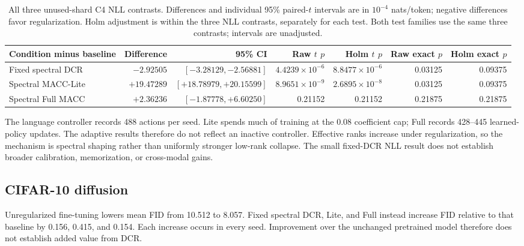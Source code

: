 \documentclass[10pt,a4paper,twocolumn]{article}
\begin{document}
\begin{table}[tbp]
\caption{All three unused-shard C4 NLL contrasts. Differences and individual
95\% paired-$t$ intervals are in $10^{-4}$ nats/token; negative differences
favor regularization. Holm adjustment is within the three NLL contrasts,
separately for each test. Both test families use the same three contrasts; intervals are unadjusted.}
\label{tab:c4_contrasts}
\centering\small
\begin{tabularx}{\textwidth}{@{}Yrrrrrr@{}}
\toprule
Condition minus baseline & Difference & 95\% CI &
Raw $t$ $p$ & Holm $t$ $p$ & Raw exact $p$ & Holm exact $p$ \\
\midrule
Fixed spectral DCR & $-2.92505$ & $[-3.28129,-2.56881]$ & $4.4239\times10^{-6}$ & $8.8477\times10^{-6}$ & 0.03125 & 0.09375 \\
Spectral MACC-Lite & $+19.47289$ & $[+18.78979,+20.15599]$ & $8.9651\times10^{-9}$ & $2.6895\times10^{-8}$ & 0.03125 & 0.09375 \\
Spectral Full MACC & $+2.36236$ & $[-1.87778,+6.60250]$ & 0.21152 & 0.21152 & 0.21875 & 0.21875 \\
\bottomrule
\end{tabularx}
\end{table}


The language controller records 488 actions per seed.
Lite spends much of training at the 0.08 coefficient cap;
Full records 428--445 learned-policy updates.
The adaptive results therefore do not reflect an inactive
controller. Effective ranks increase under regularization,
so the mechanism is spectral shaping rather than uniformly
stronger low-rank collapse.
The small fixed-DCR NLL result does not establish broader
calibration, memorization, or cross-modal gains.

\subsection{CIFAR-10 diffusion}
\label{sec:diffusion_results}

Unregularized fine-tuning lowers mean FID from 10.512 to 8.057.
Fixed spectral DCR, Lite, and Full instead increase FID
relative to that baseline by 0.156, 0.415, and 0.154.
Each increase occurs in every seed.
Improvement over the unchanged pretrained model therefore
does not establish added value from DCR.
\end{document}
